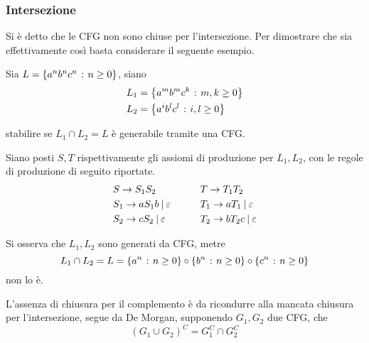 \documentclass{subfiles}
\begin{document}
\subsubsection{Intersezione}
Si è detto che le CFG non sono chiuse per l'intersezione. Per dimostrare che sia effettivamente così basta considerare il seguente esempio.
\begin{Example*}
    Sia \(L = \left\{a^{n}b^{n}c^{n} \operatorname{\: {:} \:} n \ge 0\right\}\), siano
    \[\begin{aligned}
            L_{1} & = \left\{a^{m}b^{m}c^{k} \operatorname{\: {:} \:} m,k \ge 0\right\} \\
            L_{2} & = \left\{a^{i}b^{l}c^{l} \operatorname{\: {:} \:} i,l \ge 0\right\} \\
        \end{aligned}\]

    \noindent stabilire se \(L_{1} \cap L_{2} = L\) è generabile tramite una CFG.

    \begin{Solution*}
        Siano posti \(S, T\) rispettivamente gli assiomi di produzione per \(L_{1}, L_{2}\), con le regole di produzione di seguito riportate.
        \[\begin{aligned}
                 & S \to S_{1}S_{2}                     &  & \qquad T \to T_{1} T_{2}                    \\
                 & S_{1} \to aS_{1}b \:{|}\: \varepsilon &  & \qquad T_{1} \to aT_{1} \:{|}\: \varepsilon  \\
                 & S_{2} \to cS_{2} \:{|}\: \varepsilon  &  & \qquad T_{2} \to bT_{2}c \:{|}\: \varepsilon \\
            \end{aligned}\]

        \noindent Si osserva che \(L_{1}, L_{2}\) sono generati da CFG, metre
        \[
            L_{1} \cap L_{2} = L = \left\{a^{n} \operatorname{\: {:} \:} n \ge 0\right\} \circ \left\{b^{n} \operatorname{\: {:} \:} n \ge 0\right\} \circ \left\{c^{n} \operatorname{\: {:} \:} n \ge 0\right\}
        \]
        non lo è.
    \end{Solution*}
\end{Example*}

\begin{Note*}
    L'assenza di chiusura per il complemento è da ricondurre alla mancata chiusura per l'intersezione, segue da De Morgan, supponendo \(G_{1}, G_{2}\) due CFG, che
    \[
        (G_{1} \cup G_{2})^{C} = G_{1}^{C} \cap G_{2}^{C}
    \]
\end{Note*}
\end{document}
